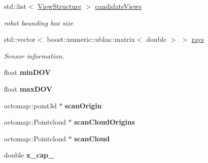 \begin{DoxyCompactItemize}
\item 
std\+::list$<$ \hyperlink{classViewStructure}{View\+Structure} $>$ \hyperlink{classPartialModelBase_a7c84f416786411a279a644f3b539dd24}{candidate\+Views}\hypertarget{classPartialModelBase_a7c84f416786411a279a644f3b539dd24}{}\label{classPartialModelBase_a7c84f416786411a279a644f3b539dd24}

\begin{DoxyCompactList}\small\item\em robot bounding box size \end{DoxyCompactList}\item 
std\+::vector$<$ boost\+::numeric\+::ublas\+::matrix$<$ double $>$ $>$ \hyperlink{classPartialModelBase_a9f828d5662769fd3d2e12bb66869d8e0}{rays}\hypertarget{classPartialModelBase_a9f828d5662769fd3d2e12bb66869d8e0}{}\label{classPartialModelBase_a9f828d5662769fd3d2e12bb66869d8e0}

\begin{DoxyCompactList}\small\item\em Sensor information. \end{DoxyCompactList}\item 
float {\bfseries min\+D\+OV}\hypertarget{classPartialModelBase_a14572c1fd31a4b984425f4785e68cbd9}{}\label{classPartialModelBase_a14572c1fd31a4b984425f4785e68cbd9}

\item 
float {\bfseries max\+D\+OV}\hypertarget{classPartialModelBase_a98eb201c10a22f768bc672b852c51173}{}\label{classPartialModelBase_a98eb201c10a22f768bc672b852c51173}

\item 
octomap\+::point3d $\ast$ {\bfseries scan\+Origin}\hypertarget{classPartialModelBase_a0f62337f2c63f3cf0913fcdb693ed1f9}{}\label{classPartialModelBase_a0f62337f2c63f3cf0913fcdb693ed1f9}

\item 
octomap\+::\+Pointcloud $\ast$ {\bfseries scan\+Cloud\+Origins}\hypertarget{classPartialModelBase_a52a612dfbbb16623f73fc722482637fc}{}\label{classPartialModelBase_a52a612dfbbb16623f73fc722482637fc}

\item 
octomap\+::\+Pointcloud $\ast$ {\bfseries scan\+Cloud}\hypertarget{classPartialModelBase_ad875d0091299e6a34f560383c810f005}{}\label{classPartialModelBase_ad875d0091299e6a34f560383c810f005}

\item 
double {\bfseries x\+\_\+cap\+\_}\hypertarget{classPartialModelBase_acdd1cb2ec1dfc006f723e644d8f40149}{}\label{classPartialModelBase_acdd1cb2ec1dfc006f723e644d8f40149}


\end{DoxyCompactItemize}
